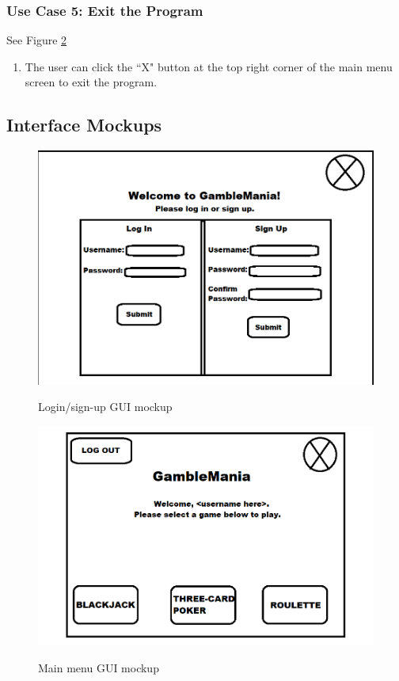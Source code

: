 \documentclass[10pt,conference,onecolumn,compsoc]{IEEEtran}
\begin{document}
\subsubsection{Use Case 5: Exit the Program}
See Figure \ref{fig:main}
\begin{enumerate}
\item The user can click the ``X" button at the top right corner of the main menu screen to exit the program.
\end{enumerate}

\newpage
\subsection{Interface Mockups}

\begin{figure}[h]
\caption{Login/sign-up GUI mockup}
\includegraphics[scale=0.4]{login}
\label{fig:login}
\centering
\end{figure}

\begin{figure}[h]
\caption{Main menu GUI mockup}
\includegraphics[scale=0.4]{main}
\label{fig:main}
\centering
\end{figure}
\end{document}

